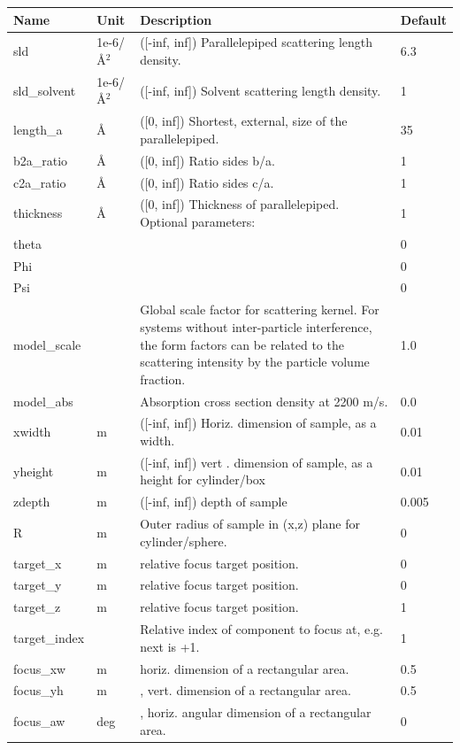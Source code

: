 \begin{longtable}{p{}p{}p{}p{}}
\toprule
\textbf{Name} & \textbf{Unit} & \textbf{Description} & \textbf{Default} \\
\midrule
\endhead
sld & 1e-6/\AA{}$^{2}$ & ([-inf, inf]) Parallelepiped scattering length density. & 6.3 \\
sld\_solvent & 1e-6/\AA{}$^{2}$ & ([-inf, inf]) Solvent scattering length density. & 1 \\
length\_a & \AA{} & ([0, inf]) Shortest, external, size of the parallelepiped. & 35 \\
b2a\_ratio & \AA{} & ([0, inf]) Ratio sides b/a. & 1 \\
c2a\_ratio & \AA{} & ([0, inf]) Ratio sides c/a. & 1 \\
thickness & \AA{} & ([0, inf]) Thickness of parallelepiped. Optional parameters: & 1 \\
theta &  &  & 0 \\
Phi &  &  & 0 \\
Psi &  &  & 0 \\
model\_scale &   & Global scale factor for scattering kernel. For systems without inter-particle interference, the form factors can be related to the scattering intensity by the particle volume fraction. & 1.0 \\
model\_abs &   & Absorption cross section density at 2200 m/s. & 0.0 \\
xwidth & m & ([-inf, inf]) Horiz. dimension of sample, as a width. & 0.01 \\
yheight & m & ([-inf, inf]) vert . dimension of sample, as a height for cylinder/box & 0.01 \\
zdepth & m & ([-inf, inf]) depth of sample & 0.005 \\
R & m & Outer radius of sample in (x,z) plane for cylinder/sphere. & 0 \\
target\_x & m & relative focus target position. & 0 \\
target\_y & m & relative focus target position. & 0 \\
target\_z & m & relative focus target position. & 1 \\
target\_index &   & Relative index of component to focus at, e.g. next is +1. & 1 \\
focus\_xw & m & horiz. dimension of a rectangular area. & 0.5 \\
focus\_yh & m & , vert. dimension of a rectangular area. & 0.5 \\
focus\_aw & deg & , horiz. angular dimension of a rectangular area. & 0 \\

\end{longtable}
